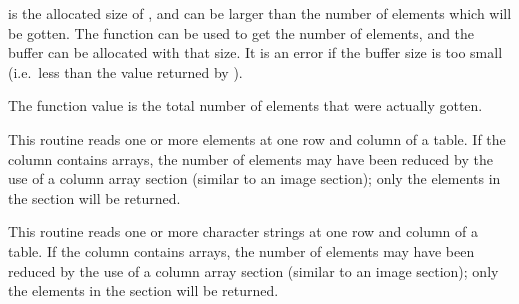  is the allocated size of ,
and  can be larger than
the number of elements which will be gotten.
The function  can be used to get the number of elements,
and the buffer can be allocated with that size.
It is an error if the buffer size is too small
(i.e.~less than the value returned by ).

The function value is the total number of elements that were actually gotten.

\callseqfcn

\begin{callseq}
\end{callseq}

This routine reads one or more elements
at one row and column of a table.
If the column contains arrays,
the number of elements may have been reduced
by the use of a column array section (similar to an image section);
only the elements in the section will be returned.

\callseqtable

\begin{callseq}
\end{callseq}

This routine reads one or more character strings
at one row and column of a table.
If the column contains arrays,
the number of elements may have been reduced
by the use of a column array section (similar to an image section);
only the elements in the section will be returned.

